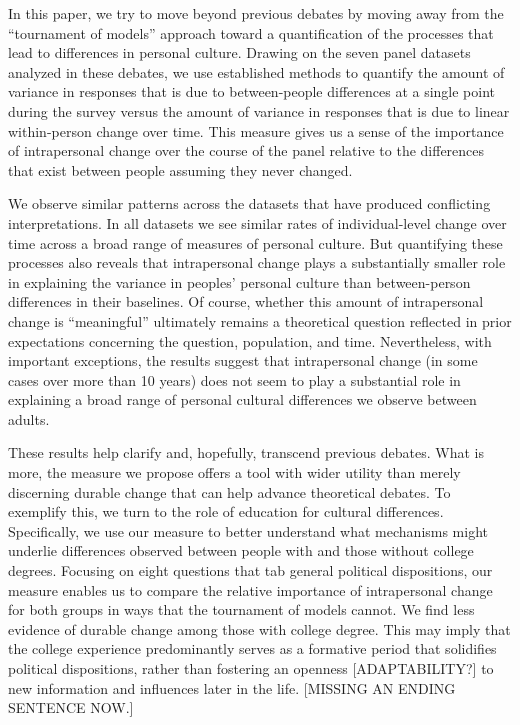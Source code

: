 \documentclass[
  11pt,
]{article}
\begin{document}
In this paper, we try to move beyond previous debates by moving away
from the ``tournament of models'' approach toward a quantification of
the processes that lead to differences in personal culture. Drawing on
the seven panel datasets analyzed in these debates, we use established
methods to quantify the amount of variance in responses that is due to
between-people differences at a single point during the survey versus
the amount of variance in responses that is due to linear within-person
change over time. This measure gives us a sense of the importance of
intrapersonal change over the course of the panel relative to the
differences that exist between people assuming they never changed.

We observe similar patterns across the datasets that have produced
conflicting interpretations. In all datasets we see similar rates of
individual-level change over time across a broad range of measures of
personal culture. But quantifying these processes also reveals that
intrapersonal change plays a substantially smaller role in explaining
the variance in peoples' personal culture than between-person
differences in their baselines. Of course, whether this amount of
intrapersonal change is ``meaningful'' ultimately remains a theoretical
question reflected in prior expectations concerning the question,
population, and time. Nevertheless, with important exceptions, the
results suggest that intrapersonal change (in some cases over more than
10 years) does not seem to play a substantial role in explaining a broad
range of personal cultural differences we observe between adults.

These results help clarify and, hopefully, transcend previous debates.
What is more, the measure we propose offers a tool with wider utility
than merely discerning durable change that can help advance theoretical
debates. To exemplify this, we turn to the role of education for
cultural differences. Specifically, we use our measure to better
understand what mechanisms might underlie differences observed between
people with and those without college degrees. Focusing on eight
questions that tab general political dispositions, our measure enables
us to compare the relative importance of intrapersonal change for both
groups in ways that the tournament of models cannot. We find less
evidence of durable change among those with college degree. This may
imply that the college experience predominantly serves as a formative
period that solidifies political dispositions, rather than fostering an
openness {[}ADAPTABILITY?{]} to new information and influences later in
the life. {[}MISSING AN ENDING SENTENCE NOW.{]}
\end{document}
